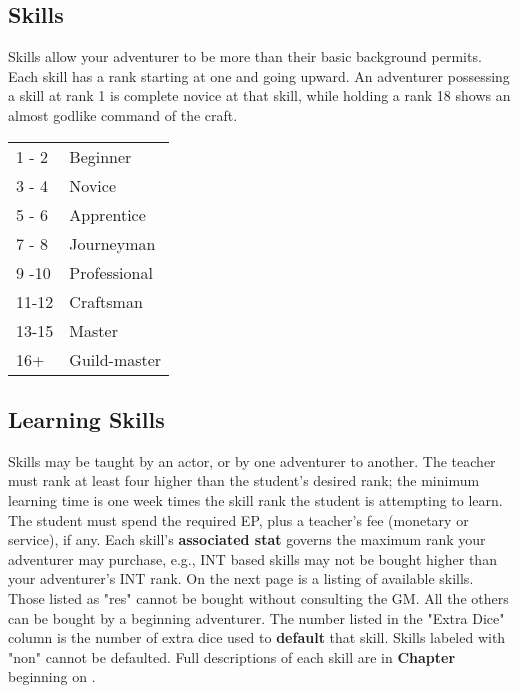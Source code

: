 \begin{multicols*}{2}
\section{Skills}
\begin{multicols*}{2}
Skills allow your adventurer to be more than their basic background permits. Each skill has a rank starting at one and going upward. An adventurer possessing a skill at rank 1 is complete novice at that skill, while holding a rank 18 shows an almost godlike command of the craft.
\begin{normbox}
\begin{tabular}{l l}
1 - 2 & Beginner\\
3 - 4 & Novice\\
5 - 6 & Apprentice\\
7 - 8 & Journeyman\\
9 -10 & Professional\\
11-12 & Craftsman\\
13-15 & Master\\
16+ & Guild-master\\
\end{tabular}
\end{normbox}
\end{multicols*}
\subsection{Learning Skills}
Skills may be taught by an actor, or by one adventurer to another. The teacher must rank at least four higher than the student's desired rank; the minimum learning time is one week times the skill rank the student is attempting to learn. The student must spend the required EP, plus a teacher's fee (monetary or service), if any.
Each skill's \textbf{associated stat} governs the maximum rank your adventurer may purchase, e.g., INT based skills may not be bought higher than your adventurer's INT rank.
On the next page is a listing of available skills. Those listed as "res" cannot be bought without consulting the GM. All the others can be bought by a beginning adventurer. The number listed in the "Extra Dice" column is the number of extra dice used to \textbf{default} that skill. Skills labeled with "non" cannot be defaulted. Full descriptions of each skill are in \textbf{Chapter } beginning on \tcpage{\pageref{ch:skills}}.
\label{create-skills}
\begin{tcbraster}[raster columns=1,boxrule=0pt,title=\textbf{Skills},left=0pt,right=0pt,top=0pt,bottom=0pt,boxsep=0pt,boxrule=0.6pt,lefttitle=2.5mm,toptitle=1mm,bottomtitle=1mm,colbacktitle=Navy,colback=white]
\end{tcbraster}

\end{multicols*}
